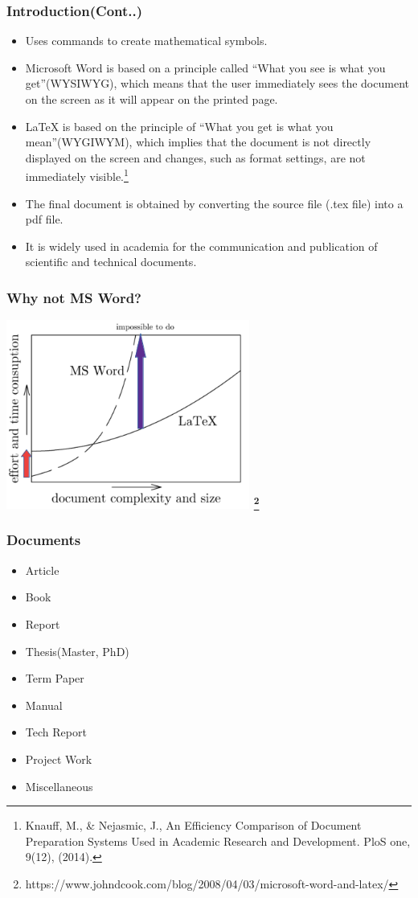 \documentclass{beamer}
\begin{document}
	\begin{frame}		
\frametitle{\bf Introduction(Cont..)}
\begin{itemize}
	\bfseries
	\item \color{red} Uses commands to create mathematical symbols.
	\item \color{blue}	Microsoft Word is based on a principle called \color{red}``What you see is what you get''(WYSIWYG),\color{blue} which means that the user immediately sees the document on the screen as it will appear on the printed page.
	 	\item \color{red} LaTeX is based on the principle of ``What you get is what you mean''(WYGIWYM), \color{blue} which implies that the document is not directly displayed on the screen and changes, such as format settings, are not immediately visible.\footnote{Knauff, M., \& Nejasmic, J., An Efficiency Comparison of Document Preparation Systems Used in Academic Research and Development. PloS one, 9(12), (2014).}
	\item \color{blue}The final document is obtained by converting the source file (.tex file) into a pdf file.
	\item \color{red} It is widely used in academia for the communication and publication
	of scientific and technical documents.
\end{itemize}
\end{frame}


	\begin{frame}		
		\frametitle{\bf Why not MS Word?}
	\bfseries \color{blue}
		\centering
		\includegraphics[width=8cm]{LW}
	\footnote{https://www.johndcook.com/blog/2008/04/03/microsoft-word-and-latex/}	
	\end{frame}


\begin{frame}
\frametitle{\bf Documents}
\begin{itemize}
	\bf 
\item \color{red}Article
\item \color{blue}Book
\item \color{red}Report
\item \color{blue}Thesis(Master, PhD)
\item \color{red}Term Paper
\item \color{blue}Manual
\item \color{red}Tech Report
\item \color{blue}Project Work
\item \color{red}Miscellaneous
\end{itemize}
\end{frame}
\end{document}
